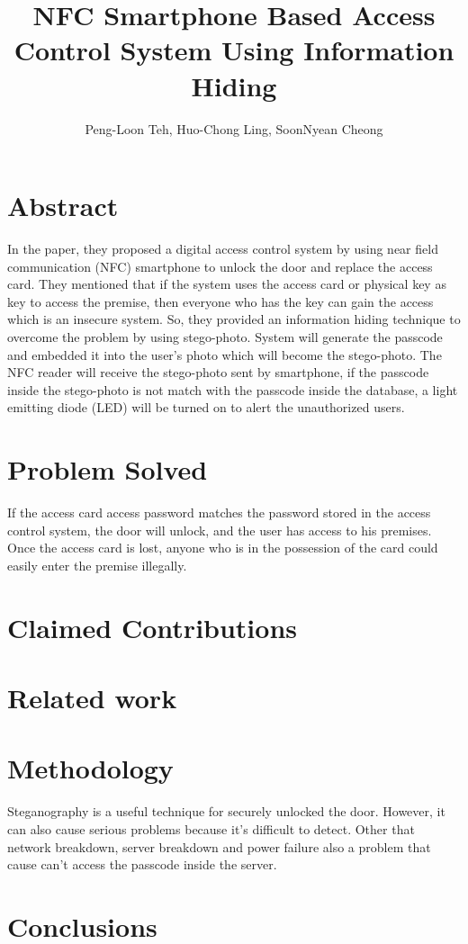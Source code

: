 \documentclass[•]{article}
\title{NFC Smartphone Based Access Control System Using Information Hiding}
\author{Peng-Loon Teh, Huo-Chong Ling, SoonNyean Cheong}
\date{}
\begin{document}

\tableofcontents
\maketitle

\section{Abstract}
\hspace{1cm}In the paper, they proposed a digital access control system by using near field communication (NFC) smartphone to unlock the door and replace the access card. They mentioned that if the system uses the access card or physical key as key to access the premise, then everyone who has the key can gain the access which is an insecure system. So, they provided an information hiding technique to overcome the problem by using stego-photo. System will generate the passcode and embedded it into the user’s photo which will become the stego-photo. The NFC reader will receive the stego-photo sent by smartphone, if the passcode inside the stego-photo is not match with the passcode inside the database, a light emitting diode (LED) will be turned on to alert the unauthorized users. ~\cite{Katzenbeisser2000}

\section{Problem Solved}
If the access card access password matches the password stored in the access control system, the door will unlock, and the user has access to his premises.
Once the access card is lost, anyone who is in the possession of the card could easily enter the premise illegally.

\section{Claimed Contributions}

\section{Related work}

\section{Methodology}
\hspace{1cm}Steganography is a useful technique for securely unlocked the door. However, it can also cause serious problems because it’s difficult to detect. Other that network breakdown, server breakdown and power failure also a problem that cause can’t access the passcode inside the server.
\section{Conclusions}


{}
\end{document}
